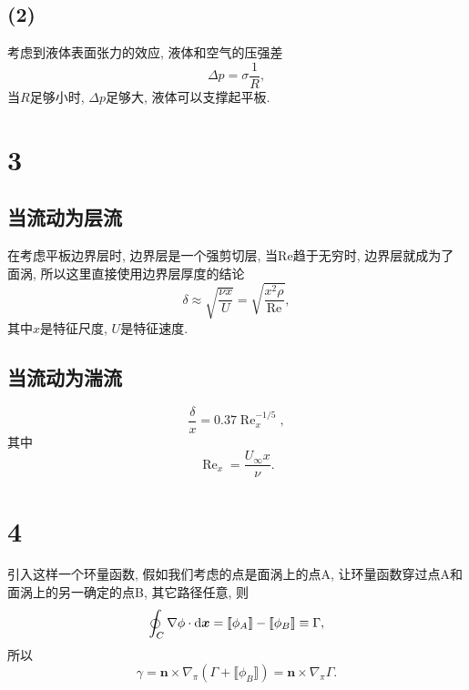 \documentclass[12pt]{article}
\begin{document}
\subsection{(2)}

考虑到液体表面张力的效应, 液体和空气的压强差
\begin{equation}
	\Delta p = \sigma \frac{1}{R},
\end{equation}
当$R$足够小时, $\Delta p$足够大, 液体可以支撑起平板. 


\section{3}

\subsection{当流动为层流}

在考虑平板边界层时, 边界层是一个强剪切层, 当$\mathrm{Re}$趋于无穷时, 边界层就成为了面涡, 所以这里直接使用边界层厚度的结论
\begin{equation}
	\delta \approx \sqrt{\frac{\nu x}{U}} = \sqrt{\frac{x^2\rho}{\mathrm{Re}}},
\end{equation}
其中$x$是特征尺度, $U$是特征速度. 

\subsection{当流动为湍流}
\begin{equation}
	\frac{\delta}{x}=0.37 \operatorname{Re}_{x}^{-1 / 5},
\end{equation}
其中
\begin{equation}
	\operatorname{Re}_x=\frac{U_{\infty} x}{\nu}.
\end{equation}

\section{4}

引入这样一个环量函数, 假如我们考虑的点是面涡上的点A, 让环量函数穿过点A和面涡上的另一确定的点B, 其它路径任意, 则
\begin{equation}
	\oint_C \nabla \phi \cdot \dif \bm{x} = \llbracket \phi_A \rrbracket - \llbracket \phi_B \rrbracket \equiv \Gamma,
\end{equation}
所以
\begin{equation}
	\gamma = \bm{n} \times \nabla_\pi (\Gamma + \llbracket \phi_B \rrbracket) = \bm{n} \times \nabla_\pi \Gamma.
\end{equation}
\end{document}
